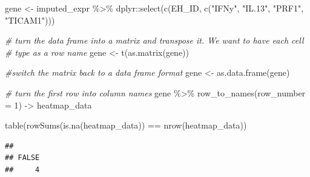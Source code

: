 \documentclass[
]{article}
\newenvironment{Shaded}{\begin{snugshade}}{\end{snugshade}}
\newcommand{\AttributeTok}[1]{\textcolor[rgb]{0.77,0.63,0.00}{#1}}
\newcommand{\CommentTok}[1]{\textcolor[rgb]{0.56,0.35,0.01}{\textit{#1}}}
\newcommand{\DecValTok}[1]{\textcolor[rgb]{0.00,0.00,0.81}{#1}}
\newcommand{\FunctionTok}[1]{\textcolor[rgb]{0.00,0.00,0.00}{#1}}
\newcommand{\NormalTok}[1]{#1}
\newcommand{\OtherTok}[1]{\textcolor[rgb]{0.56,0.35,0.01}{#1}}
\newcommand{\SpecialCharTok}[1]{\textcolor[rgb]{0.00,0.00,0.00}{#1}}
\newcommand{\StringTok}[1]{\textcolor[rgb]{0.31,0.60,0.02}{#1}}
\begin{document}
\begin{Shaded}
\begin{Highlighting}[]
\NormalTok{gene }\OtherTok{\textless{}{-}}\NormalTok{ imputed\_expr }\SpecialCharTok{\%\textgreater{}\%}\NormalTok{ dplyr}\SpecialCharTok{::}\FunctionTok{select}\NormalTok{(}\FunctionTok{c}\NormalTok{(EH\_ID, }\FunctionTok{c}\NormalTok{(}\StringTok{"IFNy"}\NormalTok{, }\StringTok{"IL.13"}\NormalTok{, }\StringTok{"PRF1"}\NormalTok{, }
                                                  \StringTok{"TICAM1"}\NormalTok{)))}
 
 \CommentTok{\# turn the data frame into a matrix and transpose it. We want to have each cell }
 \CommentTok{\# type as a row name }
\NormalTok{ gene }\OtherTok{\textless{}{-}} \FunctionTok{t}\NormalTok{(}\FunctionTok{as.matrix}\NormalTok{(gene))}
 
 \CommentTok{\#switch the matrix back to a data frame format}
\NormalTok{ gene }\OtherTok{\textless{}{-}} \FunctionTok{as.data.frame}\NormalTok{(gene)}
 
 \CommentTok{\# turn the first row into column names}
\NormalTok{ gene }\SpecialCharTok{\%\textgreater{}\%}
     \FunctionTok{row\_to\_names}\NormalTok{(}\AttributeTok{row\_number =} \DecValTok{1}\NormalTok{) }\OtherTok{{-}\textgreater{}}\NormalTok{ heatmap\_data}
 
 
 \FunctionTok{table}\NormalTok{(}\FunctionTok{rowSums}\NormalTok{(}\FunctionTok{is.na}\NormalTok{(heatmap\_data)) }\SpecialCharTok{==} \FunctionTok{nrow}\NormalTok{(heatmap\_data))}
\end{Highlighting}
\end{Shaded}

\begin{verbatim}
## 
## FALSE 
##     4
\end{verbatim}
\end{document}

